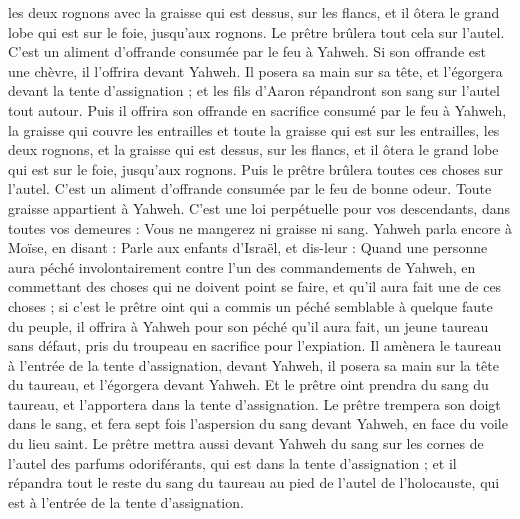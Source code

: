 \begin{multicols}{2}
les deux rognons avec la graisse qui est dessus, sur les flancs, et il ôtera le grand lobe qui est sur le foie, jusqu'aux rognons.
Le prêtre brûlera tout cela sur l'autel. C'est un aliment d'offrande consumée par le feu à Yahweh.
Si son offrande est une chèvre, il l'offrira devant Yahweh.
Il posera sa main sur sa tête, et l'égorgera devant la tente d'assignation ; et les fils d'Aaron répandront son sang sur l'autel tout autour.
Puis il offrira son offrande en sacrifice consumé par le feu à Yahweh, la graisse qui couvre les entrailles et toute la graisse qui est sur les entrailles,
les deux rognons, et la graisse qui est dessus, sur les flancs, et il ôtera le grand lobe qui est sur le foie, jusqu'aux rognons.
Puis le prêtre brûlera toutes ces choses sur l'autel. C'est un aliment d'offrande consumée par le feu de bonne odeur. Toute graisse appartient à Yahweh.
C'est une loi perpétuelle pour vos descendants, dans toutes vos demeures : Vous ne mangerez ni graisse ni sang.
\VerseOne{}Yahweh parla encore à Moïse, en disant :
Parle aux enfants d'Israël, et dis-leur : Quand une personne aura péché involontairement contre l'un des commandements de Yahweh, en commettant des choses qui ne doivent point se faire, et qu'il aura fait une de ces choses ;
 si c'est le prêtre oint qui a commis un péché semblable à quelque faute du peuple, il offrira à Yahweh pour son péché qu'il aura fait, un jeune taureau sans défaut, pris du troupeau en sacrifice pour l'expiation.
Il amènera le taureau à l'entrée de la tente d'assignation, devant Yahweh, il posera sa main sur la tête du taureau, et l'égorgera devant Yahweh.
Et le prêtre oint prendra du sang du taureau, et l'apportera dans la tente d'assignation.
Le prêtre trempera son doigt dans le sang, et fera sept fois l'aspersion du sang devant Yahweh, en face du voile du lieu saint.
Le prêtre mettra aussi devant Yahweh du sang sur les cornes de l'autel des parfums odoriférants, qui est dans la tente d'assignation ; et il répandra tout le reste du sang du taureau au pied de l'autel de l'holocauste, qui est à l'entrée de la tente d'assignation.

\end{multicols}
